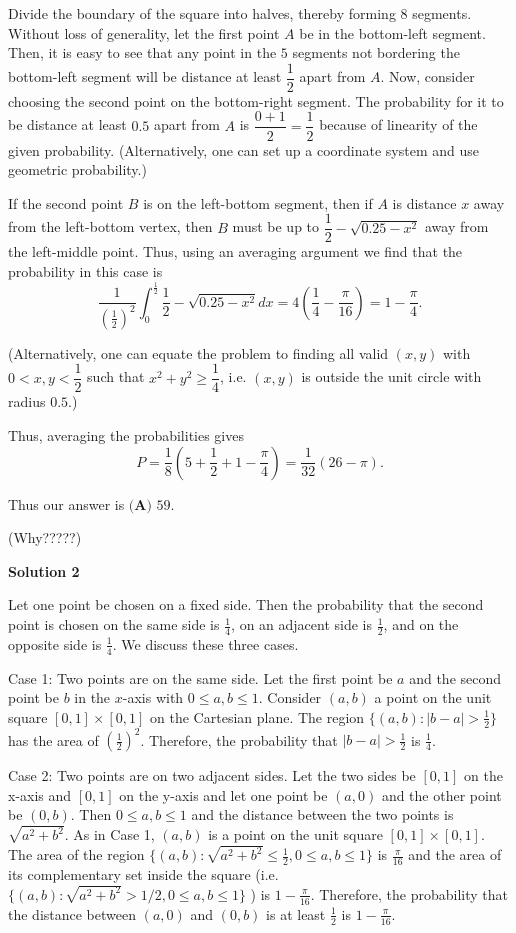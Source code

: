 \begin{enumerate}
Divide the boundary of the square into halves, thereby forming $8$ segments. Without loss of generality, let the first point $A$ be in the bottom-left segment. Then, it is easy to see that any point in the $5$ segments not bordering the bottom-left segment will be distance at least $\dfrac{1}{2}$ apart from $A$. Now, consider choosing the second point on the bottom-right segment. The probability for it to be distance at least $0.5$ apart from $A$ is $\dfrac{0 + 1}{2} = \dfrac{1}{2}$ because of linearity of the given probability. (Alternatively, one can set up a coordinate system and use geometric probability.)

 If the second point $B$ is on the left-bottom segment, then if $A$ is distance $x$ away from the left-bottom vertex, then $B$ must be up to $\dfrac{1}{2} - \sqrt{0.25 - x^2}$ away from the left-middle point. Thus, using an averaging argument we find that the probability in this case is
 \[\frac{1}{\left( \frac{1}{2} \right)^2} \int_0^{\frac{1}{2}} \dfrac{1}{2} - \sqrt{0.25 - x^2} dx = 4\left( \frac{1}{4} - \frac{\pi}{16} \right) = 1 - \frac{\pi}{4}.\]

 (Alternatively, one can equate the problem to finding all valid $(x, y)$ with $0 < x, y < \dfrac{1}{2}$  such that $x^2 + y^2 \ge \dfrac{1}{4}$, i.e. $(x, y)$ is outside the unit circle with radius $0.5.$)

 Thus, averaging the probabilities gives
 \[P = \frac{1}{8} \left( 5 + \frac{1}{2} + 1 - \frac{\pi}{4} \right) = \frac{1}{32} \left( 26 - \pi \right).\]

 Thus our answer is $\boxed{\textbf{(A) } 59}$.

 
(Why?????)

 



\textbf{Solution 2}

Let one point be chosen on a fixed side. Then the probability that the second point is chosen on the same side is $\frac{1}{4}$, on an adjacent side is $\frac{1}{2}$, and on the opposite side is $\frac{1}{4}$. We discuss these three cases. 

 Case 1: Two points are on the same side. Let the first point be $a$ and the second point be $b$ in the $x$-axis with $0\le a, b\le 1$. Consider $(a, b)$ a point on the unit square $[0,1]\times [0,1]$ on the Cartesian plane. The region $\{(a,b): |b-a|> \frac{1}{2}\}$ has the area of  $(\frac{1}{2})^2$. Therefore, the probability that $|b-a|> \frac{1}{2}$ is $\frac{1}{4}$. 

 Case 2: Two points are on two adjacent sides. Let the two sides be $[0,1]$ on the x-axis and $[0,1]$ on the y-axis and let one point be $(a, 0)$ and the other point be $(0, b)$. Then $0\le a, b\le 1$ and the distance between the two points is $\sqrt{a^2+b^2}$. As in Case 1, $(a, b)$ is a point on the unit square $[0,1]\times [0,1]$. The area of the region $\{(a,b): \sqrt{a^2+b^2} \le \frac{1}{2}, 0\le a, b\le 1\}$ is $\frac{\pi}{16}$ and the area of its complementary set inside the square (i.e. $\{(a,b): \sqrt{a^2+b^2} > 1/2, 0\le a, b\le 1\}$ ) is $1-\frac{\pi}{16}$. Therefore, the probability that the distance between $(a, 0)$ and $(0, b)$ is at least $\frac{1}{2}$ is $1-\frac{\pi}{16}$. 


\end{enumerate}
